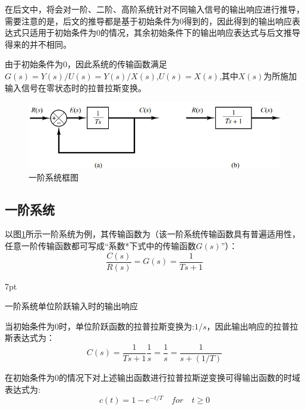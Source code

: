 \documentclass{article}
\numberwithin{equation}{section}
\numberwithin{figure}{section}
\newenvironment{formal}{%
\def\FrameCommand{%
\hspace{1pt}%
{\color{DarkBlue}\vrule width 2pt}%
{\color{formalshade}\vrule width 4pt}%
\colorbox{formalshade}%
}%
\MakeFramed{\advance\hsize-\width\FrameRestore}%
\noindent\hspace{-4.55pt}%
\begin{adjustwidth}{}{7pt}%
\vspace{2pt}\vspace{2pt}%
}
{%
\vspace{2pt}\end{adjustwidth}\endMakeFramed%
}
\begin{document}
在后文中，将会对一阶、二阶、高阶系统针对不同输入信号的输出响应进行推导，需要注意的是，后文的推导都是基于初始条件为0得到的，因此得到的输出响应表达式只适用于初始条件为0的情况，其余初始条件下的输出响应表达式与后文推导得来的并不相同。

由于初始条件为0，因此系统的传输函数满足$G(s)=Y(s)/U(s)=Y(s)/X(s)$,$U(s)=X(s)$,其中$X(s)$为所施加输入信号在零状态时的拉普拉斯变换。

\begin{figure}
    \centering
    \includegraphics[width=.9\textwidth]{Chapter5/1ordersystem.png} %
    \caption{一阶系统框图} %
    \label{1ordersystem} %
\end{figure}

\subsection{一阶系统}
以图\ref{1ordersystem}所示一阶系统为例，其传输函数为（该一阶系统传输函数具有普遍适用性，任意一阶传输函数都可写成“系数*下式中的传输函数$G(s)$”）：
\begin{equation}
    \frac{C(s)}{R(s)}=G(s)=\frac{1}{Ts+1}
\end{equation}

\begin{formal}
    一阶系统单位阶跃输入时的输出响应
\end{formal}
    当初始条件为0时，单位阶跃函数的拉普拉斯变换为:$1/s$，因此输出响应的拉普拉斯表达式为：
    \begin{equation}
        C(s)=\frac{1}{Ts+1}\frac{1}{s}=\frac{1}{s}=\frac{1}{s+(1/T)}
    \end{equation}

    在初始条件为0的情况下对上述输出函数进行拉普拉斯逆变换可得输出函数的时域表达式为:
    \begin{equation}
        c(t)=1-e^{-t/T} \quad for \quad t ≥ 0
    \end{equation}
\end{document}
